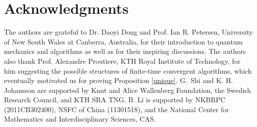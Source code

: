 \documentclass[a4paper, 11pt]{article}
\begin{document}
\medskip

\section*{Acknowledgments}
The authors are grateful to Dr. Daoyi Dong and Prof. Ian R. Petersen, University of New South Wales at Canberra, Australia, for their introduction to quantum mechanics and algorithms as well as for their inspiring discussions. The authors also thank Prof. Alexandre Proutiere, KTH Royal Institute of Technology,  for him suggesting  the possible structures of finite-time convergent algorithms, which eventually motivated  us for proving Proposition \ref{unique}. G.~Shi and K. H. Johansson are supported by Knut and Alice Wallenberg Foundation, the Swedish Research
Council, and KTH SRA TNG. B. Li is supported  by  NKBRPC (2011CB302400),  NSFC of China (11301518), and  the National Center for Mathematics and Interdisciplinary Sciences, CAS.
\end{document}
